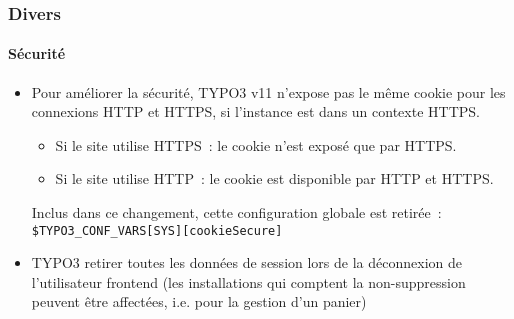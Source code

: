 %

\begin{frame}[fragile]
	\frametitle{Divers}
	\framesubtitle{Sécurité}

	\begin{itemize}
		\item Pour améliorer la sécurité, TYPO3 v11 n'expose pas le même cookie
			pour les connexions HTTP et HTTPS, si l'instance est dans un contexte HTTPS.

			\begin{itemize}
				\item Si le site utilise HTTPS~: le cookie n'est exposé que par HTTPS.
				\item Si le site utilise HTTP~: le cookie est disponible par HTTP et HTTPS.
			\end{itemize}

			Inclus dans ce changement, cette configuration globale est retirée~:
		 	\smaller\texttt{\$TYPO3\_CONF\_VARS[SYS][cookieSecure]}\normalsize

		\item TYPO3 retirer toutes les données de session lors de la déconnexion de l'utilisateur frontend\newline
			\small(les installations qui comptent la non-suppression peuvent être affectées, i.e. pour la gestion d'un panier)\normalsize

	\end{itemize}

\end{frame}

